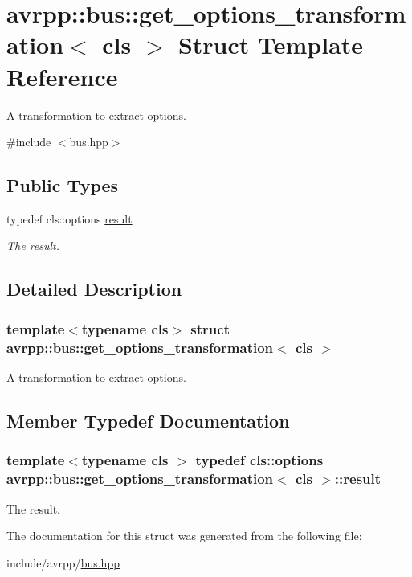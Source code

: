\hypertarget{structavrpp_1_1bus_1_1get__options__transformation}{
\section{avrpp::bus::get\_\-options\_\-transformation$<$ cls $>$ Struct Template Reference}
\label{structavrpp_1_1bus_1_1get__options__transformation}
}


A transformation to extract options.  




{\ttfamily \#include $<$bus.hpp$>$}

\subsection*{Public Types}
\begin{DoxyCompactItemize}
\item 
typedef cls::options \hyperlink{structavrpp_1_1bus_1_1get__options__transformation_a0b708eb2782739229eae3839e3200607}{result}
\begin{DoxyCompactList}\small\item\em The result. \item\end{DoxyCompactList}\end{DoxyCompactItemize}


\subsection{Detailed Description}
\subsubsection*{template$<$typename cls$>$ struct avrpp::bus::get\_\-options\_\-transformation$<$ cls $>$}

A transformation to extract options. 

\subsection{Member Typedef Documentation}
\hypertarget{structavrpp_1_1bus_1_1get__options__transformation_a0b708eb2782739229eae3839e3200607}{
\subsubsection[{result}]{\setlength{\rightskip}{0pt plus 5cm}template$<$typename cls $>$ typedef cls::options {\bf avrpp::bus::get\_\-options\_\-transformation}$<$ cls $>$::{\bf result}}}
\label{structavrpp_1_1bus_1_1get__options__transformation_a0b708eb2782739229eae3839e3200607}


The result. 



The documentation for this struct was generated from the following file:\begin{DoxyCompactItemize}
\item 
include/avrpp/\hyperlink{bus_8hpp}{bus.hpp}\end{DoxyCompactItemize}
